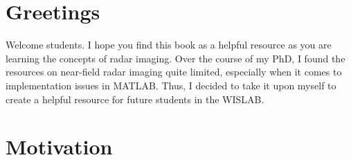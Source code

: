 \section{Greetings}
Welcome students. I hope you find this book as a helpful resource as you are learning the concepts of radar imaging. Over the course of my PhD, I found the resources on near-field radar imaging quite limited, especially when it comes to implementation issues in MATLAB. Thus, I decided to take it upon myself to create a helpful resource for future students in the WISLAB.

\section{Motivation}
